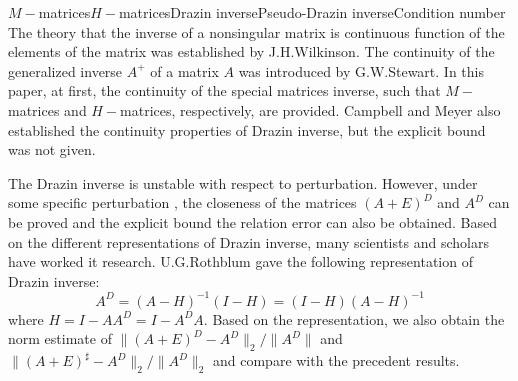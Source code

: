 
\begin{Eabstract}{$M-$matrices}{$H-$matrices}{Drazin inverse}{Pseudo-Drazin inverse}{Condition number}
The theory that the inverse of a nonsingular matrix is continuous function of the elements of the matrix was established by J.\nbs H.\nbs Wilkinson. The continuity of the generalized inverse $A^+$ of a matrix $A$ was introduced by G.\nbs W.\nbs Stewart. In this paper, at first, the continuity of the special matrices inverse, such that $M-$matrices and $H-$matrices, respectively, are provided. Campbell and Meyer also established the continuity properties of Drazin inverse, but the explicit bound was not given.\par
The Drazin inverse is unstable with respect to perturbation. However, under some specific perturbation , the closeness of the matrices $(A+E)^D$ and $A^D$ can be proved and the explicit bound the relation error can also be obtained. Based on the different representations of Drazin inverse, many scientists and scholars have worked it research. U.\nbs G.\nbs Rothblum gave the following representation of Drazin inverse:
$$A^D=(A-H)^{-1}(I-H)=(I-H)(A-H)^{-1}$$
where $H=I-AA^D=I-A^DA$. Based on the representation, we also obtain the norm estimate of $\|(A+E)^D-A^D\|_2/\| A^D\|$ and $\|(A+E)^\sharp-A^D\|_2/\|A^D\|_2$ and compare with the precedent results.
\end{Eabstract}
